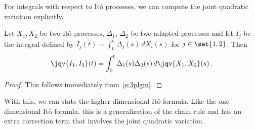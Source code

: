 For integrals with respect to It\^o processes, we can compute the joint quadratic variation explicitly.
\begin{proposition}
  Let $X_1, X_2$ be two It\^o processes, $\Delta_1$, $\Delta_2$ be two adapted processes and let $I_j$ be the integral defined by $I_j(t) = \int_0^t \Delta_j(s) \, d X_i(s)$ for $j \in \set{1, 2}$.
  Then
  \begin{equation*}
    \jqv{I_1, I_2}(t) = \int_0^t \Delta_1(s) \Delta_2(s) \, d\jqv{X_1, X_2}(s) \,.
  \end{equation*}
\end{proposition}
\begin{proof}
  This follows immediately from~\eqref{e:3plgm}.
\end{proof}

With this, we can state the higher dimensional It\^o formula.
Like the one dimensional It\^o formula, this is a generalization of the chain rule and has an extra correction term that involves the joint quadratic variation.

